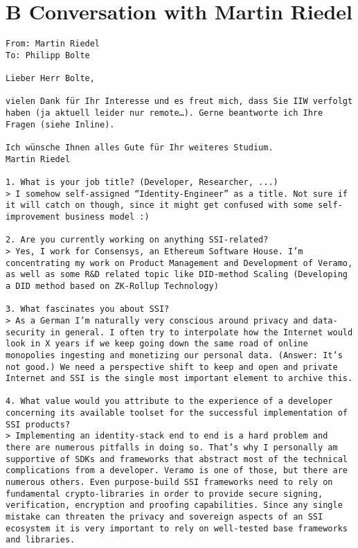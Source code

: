 \section*{B Conversation with Martin Riedel}\label{appendix: riedel}
\begin{Verbatim}[breaklines=true, breaksymbol={}, breaksymbolsepleftnchars=2]
From: Martin Riedel
To: Philipp Bolte

Lieber Herr Bolte,

vielen Dank für Ihr Interesse und es freut mich, dass Sie IIW verfolgt haben (ja aktuell leider nur remote…). Gerne beantworte ich Ihre Fragen (siehe Inline).

Ich wünsche Ihnen alles Gute für Ihr weiteres Studium.
Martin Riedel

1. What is your job title? (Developer, Researcher, ...)
> I somehow self-assigned “Identity-Engineer” as a title. Not sure if it will catch on though, since it might get confused with some self-improvement business model :)

2. Are you currently working on anything SSI-related?
> Yes, I work for Consensys, an Ethereum Software House. I’m concentrating my work on Product Management and Development of Veramo, as well as some R&D related topic like DID-method Scaling (Developing a DID method based on ZK-Rollup Technology)

3. What fascinates you about SSI?
> As a German I’m naturally very conscious around privacy and data-security in general. I often try to interpolate how the Internet would look in X years if we keep going down the same road of online monopolies ingesting and monetizing our personal data. (Answer: It’s not good.) We need a perspective shift to keep and open and private Internet and SSI is the single most important element to archive this.

4. What value would you attribute to the experience of a developer concerning its available toolset for the successful implementation of SSI products?
> Implementing an identity-stack end to end is a hard problem and there are numerous pitfalls in doing so. That’s why I personally am supportive of SDKs and frameworks that abstract most of the technical complications from a developer. Veramo is one of those, but there are numerous others. Even purpose-build SSI frameworks need to rely on fundamental crypto-libraries in order to provide secure signing, verification, encryption and proofing capabilities. Since any single mistake can threaten the privacy and sovereign aspects of an SSI ecosystem it is very important to rely on well-tested base frameworks and libraries.


\end{Verbatim}
